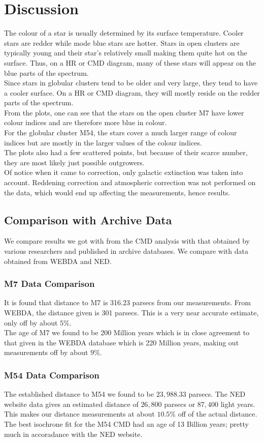 \documentclass[12pt]{article}
\begin{document}
	
	\section{Discussion}
	The colour of a star is usually determined by its surface temperature. Cooler stars are redder while mode blue stars are hotter. Stars in open clusters are typically young and their star's relatively small making them quite hot on the surface. Thus, on a HR or CMD diagram, many of these stars will appear on the blue parts of the spectrum.\\
	Since stars in globular clusters tend to be older and very large, they tend to have a cooler surface. On a HR or CMD diagram, they will mostly reside on the redder parts of the spectrum.\\
	From the plots, one can see that the stars on the open cluster M7 have lower colour indices and are therefore more blue in colour.\\
	For the globular cluster M54, the stars cover a much larger range of colour indices but are mostly in the larger values of the colour indices.\\
	The plots also had a few scattered points, but because of their scarce number, they are most likely just possible outgrowers.\\
	Of notice when it came to correction, only galactic extinction was taken into account. Reddening correction and atmospheric correction was not performed on the data, which would end up affecting the measurements, hence results.
		\subsection{Comparison with Archive Data}
		We compare results we got with from the CMD analysis with that obtained by various researchers and published in archive databases. We compare with data obtained from WEBDA and NED.
		\subsubsection{M7 Data Comparison}
		It is found that distance to M7 is 316.23 parsecs from our measurements. From WEBDA, the distance given is 301 parsecs. This is a very near accurate estimate, only off by about $5\%$.\\
		The age of M7 we found to be 200 Million years which is in close agreement to that given in the WEBDA database which is 220 Million years, making out measurements off by about $9\%$.
		\subsubsection{M54 Data Comparison}
		The established distance to M54 we found to be $23,988.33$ parsecs. The NED website data gives an estimated distance of $26,800$ parsecs or $87,400$ light years. This makes our distance measurements at about $10.5\%$ off of the actual distance.\\
		The best isochrone fit for the M54 CMD had an age of 13 Billion years; pretty much in accoradance with the NED website.
\end{document}
